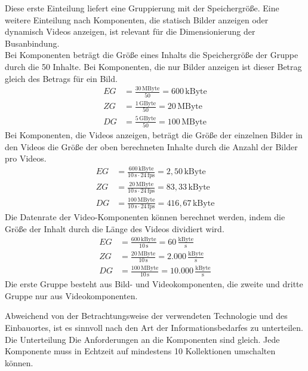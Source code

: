 Diese erste Einteilung liefert eine Gruppierung mit der Speichergröße. Eine weitere Einteilung nach Komponenten, die statisch Bilder anzeigen oder dynamisch Videos anzeigen, ist relevant für die Dimensionierung der Busanbindung. \\
Bei Komponenten beträgt die Größe eines Inhalts die Speichergröße der Gruppe durch die 50 Inhalte. Bei Komponenten, die nur Bilder anzeigen ist dieser Betrag gleich des Betrags für ein Bild.
\begin{align}
	EG &= \frac{30\,\mathrm{MByte}}{50} = 600\,\mathrm{kByte} \\
	ZG &= \frac{1\,\mathrm{GByte}}{50} =  20\,\mathrm{MByte} \\
	DG &= \frac{5\,\mathrm{GByte}}{50} = 100\,\mathrm{MByte}
\end{align}
Bei Komponenten, die Videos anzeigen, beträgt die Größe der einzelnen Bilder in den Videos die Größe der oben berechneten Inhalte durch die Anzahl der Bilder pro Videos.
\begin{align}
	EG &= \frac{600\,\mathrm{kByte}}{10\,\mathrm{s} \cdot 24\,\mathrm{fps}} = 2,50\,\mathrm{kByte} \\
	ZG &= \frac{20\,\mathrm{MByte}}{10\,\mathrm{s} \cdot 24\,\mathrm{fps}} = 83,33\,\mathrm{kByte} \\
	DG &= \frac{100\,\mathrm{MByte}}{10\,\mathrm{s} \cdot 24\,\mathrm{fps}} = 416,67\,\mathrm{kByte}
\end{align}
Die Datenrate der Video-Komponenten können berechnet werden, indem die Größe der Inhalt durch die Länge des Videos dividiert wird.
\begin{align}
	EG &= \frac{600\,\mathrm{kByte}}{10\,\mathrm{s}} = 60\,\frac{\mathrm{kByte}}{\mathrm{s}}\\
	ZG &= \frac{20\,\mathrm{MByte}}{10\,\mathrm{s}} = 2.000\,\frac{\mathrm{kByte}}{\mathrm{s}} \\
	DG &= \frac{100\,\mathrm{MByte}}{10\,\mathrm{s}} = 10.000\,\frac{\mathrm{kByte}}{\mathrm{s}}
\end{align}
Die erste Gruppe besteht aus Bild- und Videokomponenten, die zweite und dritte Gruppe nur aus Videokomponenten.



Abweichend von der Betrachtungsweise der verwendeten Technologie und des Einbauortes, ist es sinnvoll nach den Art der Informationsbedarfes zu unterteilen. Die Unterteilung 
Die Anforderungen an die Komponenten sind gleich. Jede Komponente muss in Echtzeit auf mindestens 10 Kollektionen umschalten können.
